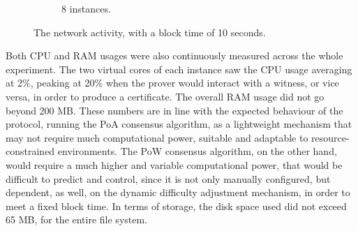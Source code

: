 \begin{figure} [h!]
\begin{subfigure}[b]{\textwidth}
        \caption{8 instances.}
        \label{fig:blockchain-blocks-generation-8-instances}
    \end{subfigure}
    \caption{The network activity, with a block time of 10 seconds.}
    \label{fig:blockchain-blocks-generation}
\end{figure}

Both CPU and RAM usages were also continuously measured across the whole experiment. The two virtual cores of each instance saw the CPU usage averaging at 2\%, peaking at 20\% when the prover would interact with a witness, or vice versa, in order to produce a \pol{} certificate. The overall RAM usage did not go beyond 200 MB. These numbers are in line with the expected behaviour of the protocol, running the PoA consensus algorithm, as a lightweight mechanism that may not require much computational power, suitable and adaptable to resource-constrained environments. The PoW consensus algorithm, on the other hand, would require a much higher and variable computational power, that would be difficult to predict and control, since it is not only manually configured, but dependent, as well, on the dynamic difficulty adjustment mechanism, in order to meet a fixed block time. In terms of storage, the disk space used did not exceed 65 MB, for the entire file system.

